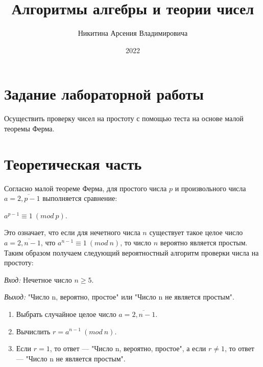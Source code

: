 \documentclass[bachelor, och, labwork]{shiza}
\begin{document}
\title{Алгоритмы алгебры и теории чисел}





\author{Никитина Арсения Владимировича}




\date{2022}

\maketitle



\tableofcontents

\section{Задание лабораторной работы}

Осуществить проверку чисел на простоту с помощью теста на основе малой теоремы 
Ферма.

\section{Теоретическая часть}

Согласно малой теореме Ферма, для простого числа $p$ и произвольного числа 
$a = \overline{2,p-1}$ выполняется сравнение:
\begin{center}
    $a^{p-1} \equiv 1 ~ (mod ~ p)$.
\end{center}

Это означает, что если для нечетного числа $n$ существует такое целое число
$a = \overline{2,n-1}$, что $a^{n-1} \equiv 1 ~ (mod ~ n)$, то число $n$ вероятно
является простым. Таким образом получаем следующий вероятностный алгоритм
проверки числа на простоту:

\textit{Вход:} Нечетное число $n \geq 5$.

\textit{Выход:} "Число n, вероятно, простое" или "Число n не является простым".

\begin{enumerate}
    \item Выбрать случайное целое число $a = \overline{2, n-1}$.
    \item Вычислить $r = a^{n-1} ~(mod ~ n)$.
    \item Если $r = 1$, то ответ --- "Число n, вероятно, простое", а если $r\neq 1$,
          то ответ --- "Число n не является простым".
\end{enumerate}
\end{document}

